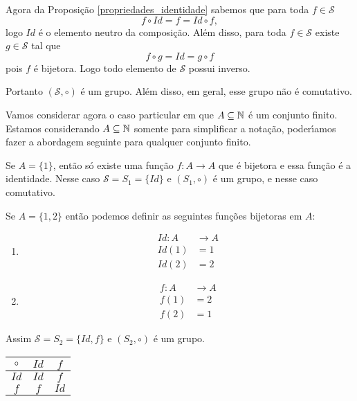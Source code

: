 Agora da Proposi\c{c}\~ao \ref{propriedades_identidade} sabemos que para toda $f \in \mathcal{S}$
\[
    f\circ Id = f = Id\circ f,
\]
logo $Id$ \'e o elemento neutro da composi\c{c}\~ao. Al\'em disso, para toda $f \in \mathcal{S}$ existe $g \in \mathcal{S}$ tal que
\[
    f\circ g = Id = g \circ f
\]
pois $f$ \'e bijetora. Logo todo elemento de $\mathcal{S}$ possui inverso.

Portanto $(\mathcal{S}, \circ)$ \'e um grupo. Al\'em disso, em geral, esse grupo n\~ao \'e comutativo.

Vamos considerar agora o caso particular em que $A \subseteq \mathbb{N}$ \'e um conjunto finito. Estamos considerando $A \subseteq \mathbb{N}$ somente para simplificar a nota\c{c}\~ao, poder{\'\i}amos fazer a abordagem seguinte para qualquer conjunto finito.

Se $A = \{1\}$, ent\~ao s\'o existe uma fun\c{c}\~ao $f : A \to A$ que \'e bijetora e essa fun\c{c}\~ao \'e a identidade. Nesse caso $\mathcal{S} = S_1 = \{Id\}$ e $(S_1, \circ)$ \'e um grupo, e nesse caso comutativo.


Se $A = \{1, 2\}$ ent\~ao podemos definir as seguintes fun\c{c}\~oes bijetoras em $A$:
\begin{multicols}{2}
    \begin{enumerate}
        \item[] \begin{align*}
            Id : A &\to A\\ Id(1) &= 1\\ Id(2) &= 2
        \end{align*}
        \item[]  \begin{align*}
            f : A &\to A\\ f(1) &= 2\\ f(2) &= 1
        \end{align*}
    \end{enumerate}
\end{multicols}

Assim $\mathcal{S} = S_2 = \{Id, f\}$ e $(S_2, \circ)$ \'e um grupo.
\begin{table}[!htb]
\centering
    \begin{tabular}{|c|c|c|}
        \hline
        $\circ$ & $Id$ & $f$\T\\
        \hline
        $Id$ & $Id$ & $f$\T\\
        \hline
        $f$ & $f$ & $Id$\T\\
        \hline
    \end{tabular}
\end{table}

